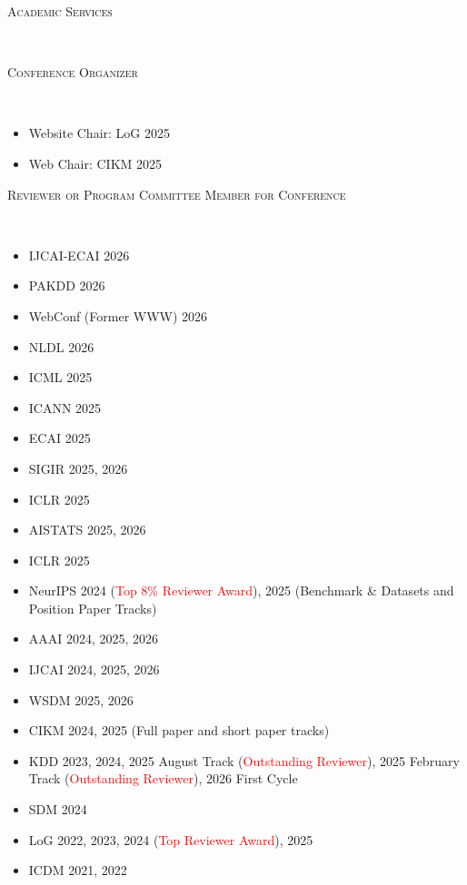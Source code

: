 \documentclass[10pt]{article}
\newenvironment{changemargin}[2]{
  \begin{list}{}{
    \setlength{\topsep}{0pt}
    \setlength{\leftmargin}{#1}
    \setlength{\rightmargin}{#2}
    \setlength{\listparindent}{\parindent}
    \setlength{\itemindent}{\parindent}
    \setlength{\parsep}{\parskip}
  }
  \item[]}{\end{list}
}
\newcommand{\lineover}{
	\begin{changemargin}{-0.05in}{-0.05in}
		\vspace*{-8pt}
		\hrulefill \\
		\vspace*{-2pt}
	\end{changemargin}
}
\newcommand{\header}[1]{
	\begin{changemargin}{-0.5in}{-0.5in}
		\scshape{#1}\\
  	\lineover
	\end{changemargin}
}
\newcommand{\RED}[1]{\textcolor{red}{#1}}
\newenvironment{body} {
	\vspace*{-16pt}
	\begin{changemargin}{-0.25in}{-0.5in}
  }
	{\end{changemargin}
}
\begin{document}
\medskip

\header{Academic Services}

\vspace{2em}
\begin{body}
    \textsc{Conference Organizer}
    \lineover
    \begin{itemize}
        \item Website Chair: LoG 2025
        \item Web Chair: CIKM 2025
    \end{itemize}
   \vspace{1em}
   \textsc{Reviewer or Program Committee Member for Conference}
    \lineover
    \begin{itemize}
        \item IJCAI-ECAI 2026
        \item PAKDD 2026
        \item WebConf (Former WWW) 2026
        \item NLDL 2026
        \item ICML 2025
        \item ICANN 2025
        \item ECAI 2025
        \item SIGIR 2025, 2026
        \item ICLR 2025
        \item AISTATS 2025, 2026
        \item ICLR 2025
        \item NeurIPS 2024 (\RED{Top 8\% Reviewer Award}), 2025 (Benchmark \& Datasets and Position Paper Tracks)
        \item AAAI 2024, 2025, 2026
        \item IJCAI 2024, 2025, 2026
        \item WSDM 2025, 2026
        \item CIKM 2024, 2025 (Full paper and short paper tracks)
        \item KDD 2023, 2024, 2025 August Track (\RED{Outstanding Reviewer}), 2025 February Track (\RED{Outstanding Reviewer}), 2026 First Cycle
        \item SDM 2024
        \item LoG 2022, 2023, 2024 (\RED{Top Reviewer Award}), 2025
        \item ICDM 2021, 2022

\end{itemize}
\end{body}
\end{document}
